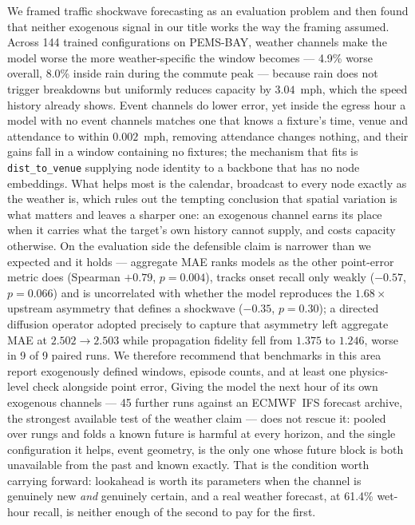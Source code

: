 \documentclass[letterpaper]{article}
\begin{document}
We framed traffic shockwave forecasting as an evaluation problem and then found that neither exogenous signal in our title works the way the framing assumed. Across 144 trained configurations on PEMS-BAY, weather channels make the model worse the more weather-specific the window becomes --- 4.9\% worse overall, 8.0\% inside rain during the commute peak --- because rain does not trigger breakdowns but uniformly reduces capacity by $3.04$~mph, which the speed history already shows. Event channels do lower error, yet inside the egress hour a model with no event channels matches one that knows a fixture's time, venue and attendance to within $0.002$~mph, removing attendance changes nothing, and their gains fall in a window containing no fixtures; the mechanism that fits is \texttt{dist\_to\_venue} supplying node identity to a backbone that has no node embeddings. What helps most is the calendar, broadcast to every node exactly as the weather is, which rules out the tempting conclusion that spatial variation is what matters and leaves a sharper one: an exogenous channel earns its place when it carries what the target's own history cannot supply, and costs capacity otherwise. On the evaluation side the defensible claim is narrower than we expected and it holds --- aggregate MAE ranks models as the other point-error metric does (Spearman $+0.79$, $p=0.004$), tracks onset recall only weakly ($-0.57$, $p=0.066$) and is uncorrelated with whether the model reproduces the $1.68\times$ upstream asymmetry that defines a shockwave ($-0.35$, $p=0.30$); a directed diffusion operator adopted precisely to capture that asymmetry left aggregate MAE at $2.502 \to 2.503$ while propagation fidelity fell from $1.375$ to $1.246$, worse in 9 of 9 paired runs. We therefore recommend that benchmarks in this area report exogenously defined windows, episode counts, and at least one physics-level check alongside point error, Giving the model the next hour of its own exogenous channels --- 45 further runs against an ECMWF~IFS forecast archive, the strongest available test of the weather claim --- does not rescue it: pooled over rungs and folds a known future is harmful at every horizon, and the single configuration it helps, event geometry, is the only one whose future block is both unavailable from the past and known exactly. That is the condition worth carrying forward: lookahead is worth its parameters when the channel is genuinely new \emph{and} genuinely certain, and a real weather forecast, at 61.4\% wet-hour recall, is neither enough of the second to pay for the first.

\fontsize{9.5pt}{10.5pt}\selectfont


\end{document}
